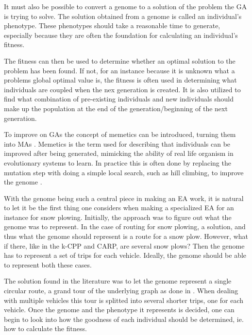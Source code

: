 It must also be possible to convert a genome to a solution of the problem the GA is trying to solve. The solution obtained from a genome is called an individual's phenotype. These phenotypes should take a reasonable time to generate, especially because they are often the foundation for calculating an individual's fitness.

The fitness can then be used to determine whether an optimal solution to the problem has been found. If not, for an instance because it is unknown what a problems global optimal value is, the fitness is often used in determining what individuals are coupled when the nex generation is created. It is also utilized to find what combination of pre-existing individuals and new individuals should make up the population at the end of the generation/beginning of the next generation.

To improve on GAs the concept of memetics can be introduced, turning them into MAs \citep{moscato1989memeticism}. Memetics is the term used for describing that individuals can be improved after being generated, mimicking the ability of real life organism in evolutionary systems to learn. In practice this is often done by replacing the mutation step with doing a simple local search, such as hill climbing, to improve the genome \citep{lacomme2004competitiveMA}.

With the genome being such a central piece in making an EA work, it is natural to let it be the first thing one considers when making a specialized EA for an instance for snow plowing. Initially, the approach was to figure out what the genome was to represent. In the case of routing for snow plowing, a solution, and thus what the genome should represent is a route for a snow plow. However, what if there, like in the k-CPP and CARP, are several snow plows? Then the genome has to represent a set of trips for each vehicle. Ideally, the genome should be able to represent both these cases.

The solution found in the literature was to let the genome represent a single circular route, a grand tour of the underlying graph as done in \citet{lacomme2001GA}. When dealing with multiple vehicles this tour is splitted into several shorter trips, one for each vehicle. Once the genome and the phenotype it represents is decided, one can begin to look into how the goodness of each individual should be determined, ie. how to calculate the fitness.


